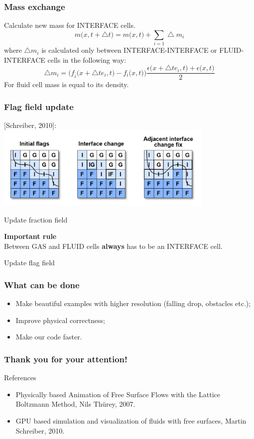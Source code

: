 \documentclass[10pt,a4paper]{beamer}
\DeclareRobustCommand{\mybox}[2][gray!20]{%
\begin{tcolorbox}[   %
        breakable,
        left=0pt,
        right=0pt,
        top=0pt,
        bottom=0pt,
        colback=#1,
        colframe=#1,
        width=\dimexpr\textwidth\relax, 
        enlarge left by=0mm,
        boxsep=5pt,
        arc=0pt,outer arc=0pt,
        ]
        #2
\end{tcolorbox}
}
\begin{document}
\begin{frame}
  \frametitle{Mass exchange}
  Calculate new mass for INTERFACE cells.
    \begin{equation}
      m\big(x, t+\bigtriangleup t\big) = m\big(x,t\big)+\sum_{i=1}\bigtriangleup m_i
    \end{equation}
    where $\bigtriangleup m_i$ is calculated only between INTERFACE-INTERFACE or
    FLUID-INTERFACE cells in the following way:
    \begin{equation}
      \bigtriangleup m_i = \Big(f_{\bar{i}}\big(x+\bigtriangleup te_i,t\big)-f_i\big(x,t\big)\Big)\frac{\epsilon\big(x+\bigtriangleup te_i,t\big)+\epsilon\big(x,t\big)}{2}
    \end{equation}
    For fluid cell mass is equal to its density.
\end{frame}

\begin{frame}
  \frametitle{Flag field update}
 [Schreiber, 2010]:
  \includegraphics[height=4cm]{interface} 


  Update fraction field
  \mybox[green!20]{
    \textbf{Important rule}\\
    Between GAS and FLUID cells \textbf{always} has to be
    an INTERFACE cell.
  }
  Update flag field
\end{frame}
\begin{frame}
  \frametitle{What can be done}
  \begin{itemize}
  \item Make beautiful examples with higher resolution (falling drop, obstacles
    etc.);
    \item Improve physical correctness;
  \item Make our code faster.
  \end{itemize}
\end{frame}

\begin{frame}
\frametitle{Thank you for your attention!}
\end{frame}


\begin{frame}
  References
  \begin{itemize}
  \item Physically based Animation of Free Surface Flows with the Lattice
    Boltzmann Method, Nils Thürey, 2007.
  \item GPU based simulation and visualization of fluids with free surfaces, Martin Schreiber, 2010.
  \end{itemize}
\end{frame}
\end{document}
